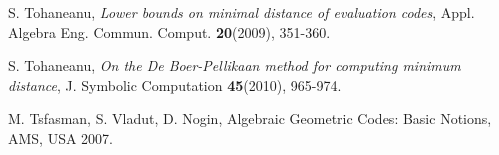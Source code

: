 \documentclass[12pt]{amsart}
\begin{document}
\begin{thebibliography}{10}
 S. Tohaneanu,
            {\em Lower bounds on minimal distance of evaluation codes},
            Appl. Algebra Eng. Commun. Comput. \textbf{20}(2009), 351-360.

 S. Tohaneanu,
            {\em On the De Boer-Pellikaan method for computing minimum distance},
            J. Symbolic Computation \textbf{45}(2010), 965-974.

 M. Tsfasman, S. Vladut, D. Nogin,
            Algebraic Geometric Codes: Basic Notions, AMS, USA 2007.

\end{thebibliography}
\end{document}
